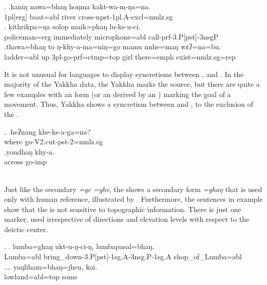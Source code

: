 \ex. \ag.kaniŋ nawa=bhaŋ hoŋma kakt-wa-m-ŋa=na.\\
{\sc 1pl[erg]} boat{\sc =abl} river cross{\sc -npst-1pl.A-excl=nmlz.sg}\\
\bg. kithrikpa=ŋa   solop       maik=phaŋ         lu-ks-u-ci.\\
policeman{\sc =erg} immediately microphone{\sc =abl} call{\sc -prf-3.P[pst]-3nsgP}\\
\bg.thawa=bhaŋ    to  ŋ-khy-a-ma=niŋ=go                    mamu nnhe=maŋ    wɛʔ=na=bu.\\
ladder{\sc =abl} up {\sc 3pl-}go{\sc -prf=ctmp=top} girl there{\sc =emph} exist{\sc [3sg]=nmlz.sg=rep}\\


It is not unusual for  languages to display syncretisms between ,  and  \citep{DeLancey1985_Etymological}. In the majority of the Yakkha data, the Yakkha  marks the source, but there are quite a few examples with an  form (or an  derived by an ) marking the goal of a movement. Thus, Yakkha shows a syncretism between  and , to the exclusion of the .

\ex. \ag.heʔnang khe-ks-a-ga=na?\\
where{\sc [abl]} go{\sc -V2.cut-pst-2=nmlz.sg}\\
\bg.yondhaŋ khy-a.\\
across{\sc [abl]} go{\sc -imp}\\
\\

Just like the secondary  \emph{=ge \ti =ghe}, the  shows a secondary form \emph{=ghaŋ} that is used only with human reference, illustrated  by \Next[a]. Furthermore, the sentences in example \Next show that the  is not sensitive to topographic information. There is just one marker, used irrespective of directions and elevation levels with respect to the deictic center.

\ex. \ag. lumba=ghaŋ     ukt-u-ŋ-ci-ŋ, lumbapasal=bhaŋ.\\
Lumba{\sc =abl} bring\_down{\sc -3.P[pst]-1sg.A-3nsg.P-1sg.A} shop\_of\_Lumba{\sc =abl}\\
 
\bg.{}{\ob}{\dots}{\cb} yaŋliham=bhaŋ=jhen,    koi.\\
[{\dots}] lowland{\sc =abl=top} some\\
 
 
